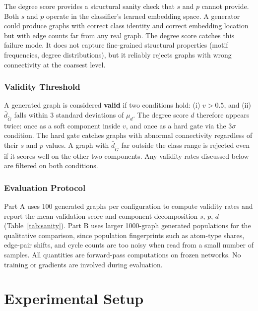 \documentclass[12pt,a4paper]{article}
\begin{document}
The degree score provides a structural sanity check that $s$ and $p$ cannot provide. Both $s$ and $p$ operate in the classifier's learned embedding space. A generator could produce graphs with correct class identity and correct embedding location but with edge counts far from any real graph. The degree score catches this failure mode. It does not capture fine-grained structural properties (motif frequencies, degree distributions), but it reliably rejects graphs with wrong connectivity at the coarsest level.

\subsubsection{Validity Threshold}

A generated graph is considered \textbf{valid} if two conditions hold: (i) $v > 0.5$, and (ii) $\bar{d}_{\tilde{G}}$ falls within 3 standard deviations of $\mu_d$. The degree score $d$ therefore appears twice: once as a soft component inside $v$, and once as a hard gate via the 3$\sigma$ condition. The hard gate catches graphs with abnormal connectivity regardless of their $s$ and $p$ values. A graph with $\bar{d}_{\tilde{G}}$ far outside the class range is rejected even if it scores well on the other two components. Any validity rates discussed below are filtered on both conditions.

\subsubsection{Evaluation Protocol}

Part A uses 100 generated graphs per configuration to compute validity rates and report the mean validation score and component decomposition $s$, $p$, $d$ (Table~\ref{tab:sanity}). Part B uses larger 1000-graph generated populations for the qualitative comparison, since population fingerprints such as atom-type shares, edge-pair shifts, and cycle counts are too noisy when read from a small number of samples. All quantities are forward-pass computations on frozen networks. No training or gradients are involved during evaluation.

\section{Experimental Setup}
\label{sec:setup}
\end{document}
